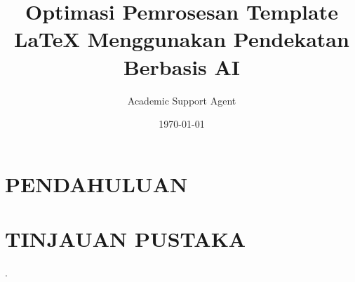 \documentclass{article}
\title{Optimasi Pemrosesan Template LaTeX Menggunakan Pendekatan Berbasis AI}
\author{Academic Support Agent}
\date{\today}
\begin{document}
\maketitle

\begin{abstract}

\end{abstract}

\chapter{PENDAHULUAN}


\chapter{TINJAUAN PUSTAKA}


\usepackage{amsmath} 
\usepackage{amssymb} 
\usepackage{amsthm}
\usepackage{color}
\usepackage{multicol}
\usepackage{enumitem}

\usepackage[left=0.75in, right=0.75in, top=1in, bottom=0.75in]{geometry}
\usepackage[parfill]{parskip}
\usepackage{mathtools}
\usepackage{fancyhdr}
\pagestyle{fancy}

\usepackage{hyperref}

\usepackage{mathrsfs}

\renewcommand{\headrulewidth}{0.4pt}
\renewcommand{\footrulewidth}{0.4pt}



  {}%
  {}%
  {}%
  {}%
  {\bfseries}%
  {.}%
  {\newline}%
  {}%

\theoremstyle{break}
\newtheorem{hwquestion}{Question}

\newtheorem{theorem}{Theorem}

\newtheorem*{lemma*}{Lemma}
\newtheorem{lemma}{Lemma}

\newtheorem{corollary}{Corollary}
\end{document}
